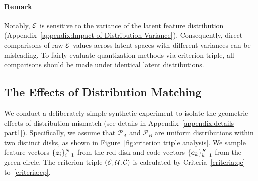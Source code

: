 \paragraph{Remark} Notably, $\mathcal{E}$ is sensitive to the variance of the latent feature distribution (Appendix~\ref{appendix:Impact of Distribution Variance}). Consequently, direct comparisons of raw $\mathcal{E}$ values across latent spaces with different variances can be misleading. To fairly evaluate quantization methods via criterion triple, all comparisons should be made under identical latent distributions.






\subsection{The Effects of Distribution Matching} \label{sec:effects of distribution matching}
We conduct a deliberately simple synthetic experiment to isolate the geometric effects of distribution mismatch (see details in Appendix~\ref{appendix:details part1}).
Specifically, we assume that $\mathcal{P}_A$ and $\mathcal{P}_B$ are uniform distributions within two distinct disks, as shown in Figure~\ref{fig:criterion triple analysis}. We sample feature vectors $\{\bm{z}_i\}_{i=1}^N$ from the red disk and code vectors $\{\bm{e}_k\}_{k=1}^K$ from the green circle. The criterion triple $(\mathcal{E}, \mathcal{U}, \mathcal{C})$ is calculated by Criteria~\ref{criteria:qe} to~\ref{criteria:cp}.

